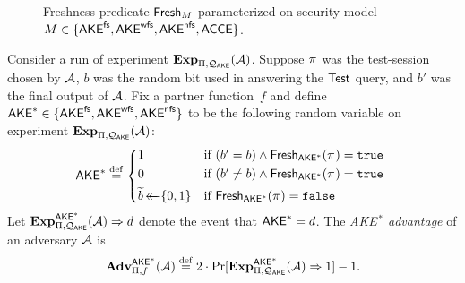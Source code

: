\begin{figure}
\caption{Freshness predicate $\mathsf{Fresh}_{M}$ parameterized on  security model $M \in \lbrace \mathsf{AKE}^{\mathsf{fs}}, \allowbreak \mathsf{AKE}^{\mathsf{wfs}}, \allowbreak \mathsf{AKE}^{\mathsf{nfs}}, \allowbreak \mathsf{ACCE} \rbrace$.
}
\label{fig:freshness:AKE}

\end{figure}








\begin{definition}\label{def:security:ake}

Consider a run of experiment $\mathbf{Exp}_{\mathrm{\Pi},\mathcal{Q}_{\mathsf{AKE}}}^{}(\mathcal{A})$.
Suppose $\oracle$ was the test-session chosen by $\mathcal{A}$,
$b$ was the random bit used in answering the $\mathsf{Test}$ query,
and $b'$ was the final output of $\mathcal{A}$.
Fix a partner function~$f$
and define $\mathsf{AKE}^* \in \lbrace \mathsf{AKE}^{\mathsf{fs}}, \allowbreak \mathsf{AKE}^{\mathsf{wfs}}, \allowbreak  \mathsf{AKE}^{\mathsf{nfs}} \rbrace$ 
to be the following random variable on experiment $\mathbf{Exp}_{\mathrm{\Pi},\mathcal{Q}_{\mathsf{AKE}}}(\mathcal{A})$:
\begin{equation}
	\ake^* \defeq
		\begin{dcases*}
			1 & if $(b' = b) \land \fresh_{\ake^*}(\oracle) = \TRUE$ \\
			0 & if $(b' \neq b) \land \fresh_{\ake^*}(\oracle) = \TRUE$\\
			\widetilde{b} \getsr \bits & if $\fresh_{\ake^*}(\oracle) = \FALSE$
		\end{dcases*}
\end{equation}
Let $\mathbf{Exp}_{\mathrm{\Pi},\mathcal{Q}_{\mathsf{AKE}}}^{\mathsf{AKE}^*}(\mathcal{A}) \Rightarrow d$ denote the event that $\mathsf{AKE}^* = d$.
The \emph{AKE$^{\,*}$ advantage} of an adversary $\mathcal{A}$ is
\begin{equation}
	\mathbf{Adv}_{\mathrm{\Pi},f}^{\mathsf{AKE}^*}(\mathcal{A}) \overset{\mathrm{def}}{=}  2\cdot \Pr[\mathbf{Exp}_{\mathrm{\Pi},\mathcal{Q}_{\mathsf{AKE}}}^{\mathsf{AKE}^*}(\mathcal{A}) \Rightarrow 1] - 1 .
\end{equation} 
\end{definition}
\smallskip




